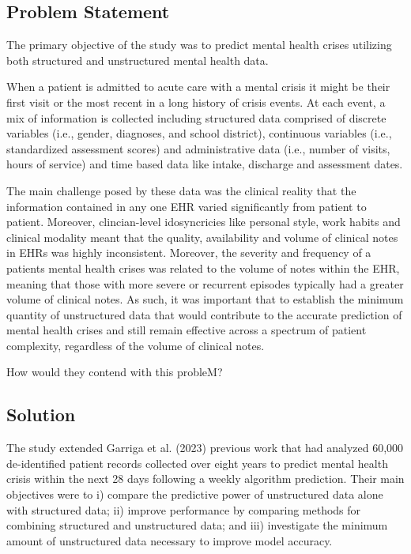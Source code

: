 \documentclass[
  letterpaper,
  DIV=11,
  numbers=noendperiod]{scrartcl}
\begin{document}
\subsection{Problem Statement}\label{problem-statement}

The primary objective of the study was to predict mental health crises
utilizing both structured and unstructured mental health data.

When a patient is admitted to acute care with a mental crisis it might
be their first visit or the most recent in a long history of crisis
events. At each event, a mix of information is collected including
structured data comprised of discrete variables (i.e., gender,
diagnoses, and school district), continuous variables (i.e.,
standardized assessment scores) and administrative data (i.e., number of
visits, hours of service) and time based data like intake, discharge and
assessment dates.

The main challenge posed by these data was the clinical reality that the
information contained in any one EHR varied significantly from patient
to patient. Moreover, clincian-level idosyncricies like personal style,
work habits and clinical modality meant that the quality, availability
and volume of clinical notes in EHRs was highly inconsistent. Moreover,
the severity and frequency of a patients mental health crises was
related to the volume of notes within the EHR, meaning that those with
more severe or recurrent episodes typically had a greater volume of
clinical notes. As such, it was important that to establish the minimum
quantity of unstructured data that would contribute to the accurate
prediction of mental health crises and still remain effective across a
spectrum of patient complexity, regardless of the volume of clinical
notes.

How would they contend with this probleM?

\subsection{\texorpdfstring{\textbf{Solution}}{Solution}}\label{solution}

The study extended Garriga et al. (2023) previous work that had analyzed
60,000 de-identified patient records collected over eight years to
predict mental health crisis within the next 28 days following a weekly
algorithm prediction. Their main objectives were to i) compare the
predictive power of unstructured data alone with structured data; ii)
improve performance by comparing methods for combining structured and
unstructured data; and iii) investigate the minimum amount of
unstructured data necessary to improve model accuracy.
\end{document}
